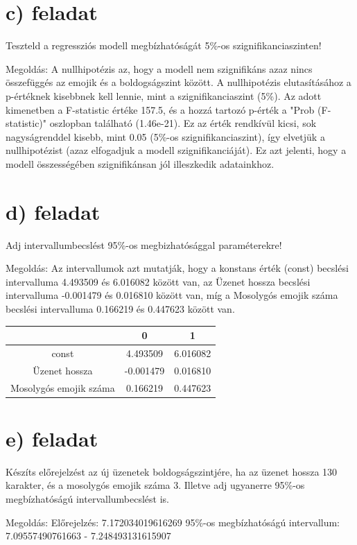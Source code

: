 \documentclass[11pt,a4paper,oneside]{report}
\begin{document}
\section{c) feladat}
Teszteld a regressziós modell megbízhatóságát 5\%-os szignifikanciaszinten!

Megoldás:
A nullhipotézis az, hogy a modell nem szignifikáns azaz nincs összefüggés az emojik és a boldogságszint között. A nullhipotézis elutasításához a p-értéknek kisebbnek kell lennie, mint a szignifikanciaszint (5\%).
Az adott kimenetben a F-statistic értéke 157.5, és a hozzá tartozó p-érték a "Prob (F-statistic)" oszlopban található (1.46e-21). Ez az érték rendkívül kicsi, sok nagyságrenddel kisebb, mint 0.05 (5\%-os szignifikanciaszint), így elvetjük a nullhipotézist (azaz elfogadjuk a modell szignifikanciáját). Ez azt jelenti, hogy a modell összességében szignifikánsan jól illeszkedik adatainkhoz.


\section{d) feladat}
Adj intervallumbecslést 95\%-os megbizhatósággal paraméterekre!

Megoldás:
Az intervallumok azt mutatják, hogy a konstans érték (const) becslési intervalluma 4.493509 és 6.016082 között van,
az Üzenet hossza becslési intervalluma -0.001479 és 0.016810 között van,
míg a Mosolygós emojik száma becslési intervalluma 0.166219 és 0.447623 között van.

\begin{tabular}{|c|c|c|}
  \hline
                         & 0         & 1        \\
  \hline
  const                  & 4.493509  & 6.016082 \\
  \hline
  Üzenet hossza          & -0.001479 & 0.016810 \\
  \hline
  Mosolygós emojik száma & 0.166219  & 0.447623 \\
  \hline
\end{tabular}




\section{e) feladat}
Készíts előrejelzést az új üzenetek boldogságszintjére, ha az üzenet hossza 130 karakter,  és a mosolygós emojik száma 3. Illetve adj ugyanerre 95\%-os megbízhatóságú intervallumbecslést is.

Megoldás:
Előrejelzés: 7.172034019616269
95\%-os megbízhatóságú intervallum: 7.09557490761663 - 7.248493131615907
\end{document}
